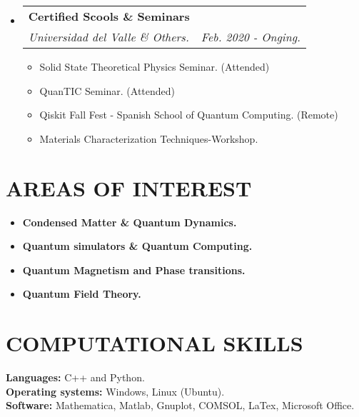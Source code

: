 \documentclass[a4paper,20pt]{article}
\makeatletter
\newcommand{\resumeSubheading}[4]{
  \vspace{-1pt}\item
    \begin{tabular*}{0.97\textwidth}{l@{\extracolsep{\fill}}r}
      \textbf{#1} & #2 \\
      \textit{#3} & \textit{#4} \\
    \end{tabular*}\vspace{-5pt}
}
\newcommand{\resumeSubHeadingListStart}{\begin{itemize}[leftmargin=*]}
\newcommand{\resumeSubHeadingListEnd}{\end{itemize}}
\makeatother
\begin{document}
\begin{minipage}{0.45\textwidth}
\resumeSubHeadingListStart
    \resumeSubheading{Certified Scools \& Seminars}{} {Universidad del Valle \& Others. }{Feb. 2020 - Onging.}
\begin{itemize}[leftmargin=*]
    \item {Solid State Theoretical Physics Seminar. (Attended)}
\vspace{-5pt}
    \item {QuanTIC Seminar. (Attended)}
\vspace{-5pt}
    \item {Qiskit Fall Fest - Spanish School of Quantum Computing. (Remote)}
\vspace{-5pt}
     \item {Materials Characterization Techniques-Workshop.}
\vspace{-5pt}
\end{itemize}
\resumeSubHeadingListEnd
\end{minipage}
\vspace{1mm}
\section{\textbf{AREAS OF INTEREST}}
\vspace{-10pt}

\begin{multicols}{2}
  \begin{itemize}
    \item \textbf{Condensed Matter \& Quantum Dynamics.}
    \item \textbf{Quantum simulators \& Quantum Computing.}
    \item \textbf{Quantum Magnetism and Phase transitions.}
    \item \textbf{Quantum Field Theory.}
  \end{itemize}
\end{multicols}



\vspace{-1pt}
\section{\textbf{COMPUTATIONAL SKILLS}}
\textbf{Languages: } C++ and Python. \\ 
\textbf{Operating systems: }Windows, Linux (Ubuntu). \\
\textbf{Software: }Mathematica, Matlab, Gnuplot, COMSOL,  LaTex, Microsoft Office. \\ 
\vspace{-2pt}
\end{document}
